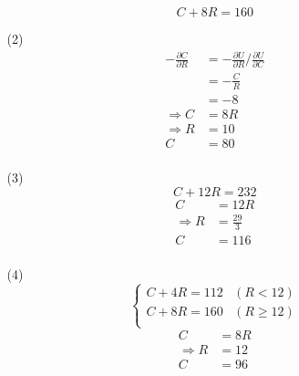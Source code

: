 \documentclass{article}
\begin{document}
\begin{enumerate}
\begin{enumerate}
            \begin{equation}
                C+8R=160 \nonumber
            \end{equation}
        \item[(2)] 
        \begin{equation}
            \begin{aligned}
                -\frac{\partial C}{\partial R}
                &=-\frac{\partial U}{\partial R}/\frac{\partial U}{\partial C} \\
                &=-\frac{C}{R} \\
                &=-8 \\
                \Rightarrow C&=8R \\
                \Rightarrow R&=10 \\
                C&=80 \\
            \end{aligned} \nonumber
        \end{equation}
        \item[(3)] 
        \begin{equation}
            C+12R=232 \nonumber
        \end{equation}
        \begin{equation}
            \begin{aligned}
                C&=12R \\
                \Rightarrow R&=\frac{29}{3} \\
                C&=116 \\
            \end{aligned} \nonumber
        \end{equation}
        \item[(4)] 
        \begin{equation}
            \begin{cases}
                C+4R=112 &(R<12) \\
                C+8R=160 &(R\geq12) \\
            \end{cases} \nonumber
        \end{equation}
        \begin{equation}
            \begin{aligned}
                C&=8R \\
                \Rightarrow R&=12 \\
                C&=96 \\
            \end{aligned} \nonumber
        \end{equation}
    \end{enumerate}
\end{enumerate}
\end{document}

